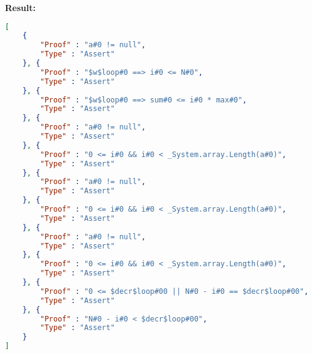 \textbf{Result: }
\begin{lstlisting}[language=json,firstnumber=1]
[
	{
		"Proof" : "a#0 != null",
		"Type" : "Assert"
	}, {
		"Proof" : "$w$loop#0 ==> i#0 <= N#0",
		"Type" : "Assert"
	}, {
		"Proof" : "$w$loop#0 ==> sum#0 <= i#0 * max#0",
		"Type" : "Assert"
	}, {
		"Proof" : "a#0 != null",
		"Type" : "Assert"
	}, {
		"Proof" : "0 <= i#0 && i#0 < _System.array.Length(a#0)",
		"Type" : "Assert"
	}, {
		"Proof" : "a#0 != null",
		"Type" : "Assert"
	}, {
		"Proof" : "0 <= i#0 && i#0 < _System.array.Length(a#0)",
		"Type" : "Assert"
	}, {
		"Proof" : "a#0 != null",
		"Type" : "Assert"
	}, {
		"Proof" : "0 <= i#0 && i#0 < _System.array.Length(a#0)",
		"Type" : "Assert"
	}, {
		"Proof" : "0 <= $decr$loop#00 || N#0 - i#0 == $decr$loop#00",
		"Type" : "Assert"
	}, {
		"Proof" : "N#0 - i#0 < $decr$loop#00",
		"Type" : "Assert"
	}
]
\end{lstlisting}



